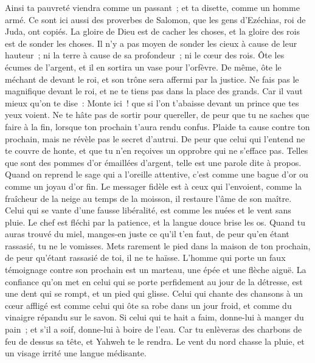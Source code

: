 \begin{multicols}{2}
Ainsi ta pauvreté viendra comme un passant~; et ta disette, comme un homme armé.
\VerseOne{}Ce sont ici aussi des proverbes de Salomon, que les gens d'Ezéchias, roi de Juda, ont copiés.
La gloire de Dieu est de cacher les choses, et la gloire des rois est de sonder les choses.
Il n'y a pas moyen de sonder les cieux à cause de leur hauteur~; ni la terre à cause de sa profondeur~; ni le cœur des rois.
Ôte les écumes de l'argent, et il en sortira un vase pour l'orfèvre.
 De même, ôte le méchant de devant le roi, et son trône sera affermi par la justice.
Ne fais pas le magnifique devant le roi, et ne te tiens pas dans la place des grands.
Car il vaut mieux qu'on te dise~: Monte ici~! que si l'on t'abaisse devant un prince que tes yeux voient.
Ne te hâte pas de sortir pour quereller, de peur que tu ne saches que faire à la fin, lorsque ton prochain t'aura rendu confus.
Plaide ta cause contre ton prochain, mais ne révèle pas le secret d'autrui.
De peur que celui qui l'entend ne te couvre de honte, et que tu n'en reçoives un opprobre qui ne s'efface pas.
Telles que sont des pommes d'or émaillées d'argent, telle est une parole dite à propos.
Quand on reprend le sage qui a l'oreille attentive, c'est comme une bague d'or ou comme un joyau d'or fin.
Le messager fidèle est à ceux qui l'envoient, comme la fraîcheur de la neige au temps de la moisson, il restaure l'âme de son maître.
Celui qui se vante d'une fausse libéralité, est comme les nuées et le vent sans pluie.
Le chef est fléchi par la patience, et la langue douce brise les os.
Quand tu auras trouvé du miel, manges-en juste ce qu'il t'en faut, de peur qu'en étant rassasié, tu ne le vomisses.
Mets rarement le pied dans la maison de ton prochain, de peur qu'étant rassasié de toi, il ne te haïsse.
L'homme qui porte un faux témoignage contre son prochain est un marteau, une épée et une flèche aiguë.
La confiance qu'on met en celui qui se porte perfidement au jour de la détresse, est une dent qui se rompt, et un pied qui glisse.
Celui qui chante des chansons à un cœur affligé est comme celui qui ôte sa robe dans un jour froid, et comme du vinaigre répandu sur le savon.
Si celui qui te hait a faim, donne-lui à manger du pain~; et s'il a soif, donne-lui à boire de l'eau.
Car tu enlèveras des charbons de feu de dessus sa tête, et Yahweh te le rendra.
Le vent du nord chasse la pluie, et un visage irrité une langue médisante.

\end{multicols}
